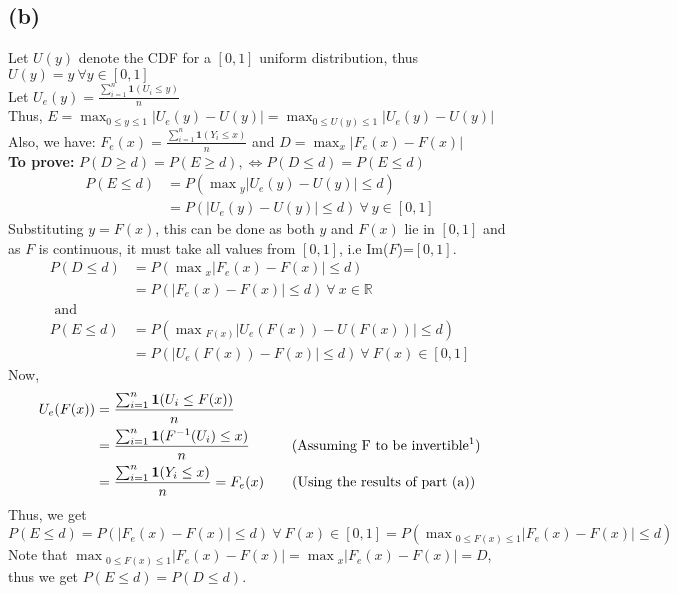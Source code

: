 \documentclass[11pt, fleqn]{article}
\begin{document}
\subsection*{(b)}
Let $U(y)$ denote the CDF for a $[0, 1]$ uniform distribution, thus $U(y) = y\  \forall y\in[0,1]$\\
Let $U_e(y) = \frac{\sum_{i=1}^n\mathbf{1}(U_i \le y)}{n} $\\
Thus, $E = \max_{0\le y\le 1} | U_e(y) - U(y) | = \max_{0\le U(y)\le 1} | U_e(y) - U(y) | $\\
Also, we have: $F_e(x) = \frac{\sum_{i=1}^n\mathbf{1}(Y_i \le x)}{n} $ and $D = \max_x | F_e(x) - F(x) |$\\
\textbf{To prove:} $P(D \ge d) = P(E \ge d), \iff P(D \le d) = P(E\le d)$\\
$$
\begin{aligned}
    P(E \le d) &= P(\max{}_y | U_e(y) - U(y) | \le d)\\
    &= P(| U_e(y) - U(y) | \le d) \ \forall \ y\in [0, 1]
\end{aligned}
$$
Substituting $y = F(x)$, this can be done as both $y$ and $F(x)$ lie in $[0, 1]$ and as $F$ is continuous, it must take all values from $[0, 1]$, i.e Im($F$)=$[0, 1]$.
$$
\begin{aligned}
    P(D \le d) &= P(\max{}_x | F_e(x) - F(x) | \le d)\\
    &= P(| F_e(x) - F(x) | \le d) \ \forall \ x\in\mathbb{R}\\
    \text{ and }\\
    P(E \le d) &= P(\max{}_{F(x)} | U_e(F(x)) - U(F(x)) | \le d)\\
    &= P(| U_e(F(x)) - F(x) | \le d) \ \forall \ F(x)\in [0, 1]
\end{aligned}
$$
Now,
$$
\begin{aligned}
   U_e(F(x)) &=  \frac{\sum_{i=1}^n\mathbf{1}(U_i \le F(x))}{n}\\
   &= \frac{\sum_{i=1}^n\mathbf{1}(F^{-1}(U_i) \le x)}{n} \hspace{3em} \text{(Assuming F to be invertible\footnotemark)}\\
   &= \frac{\sum_{i=1}^n\mathbf{1}(Y_i \le x)}{n} = F_e(x) \hspace{2em} \text{(Using the results of part (a))}
\end{aligned}
$$
Thus, we get $P(E \le d) = P(| F_e(x) - F(x) | \le d) \ \forall \ F(x)\in [0, 1] = P(\max{}_{0\le F(x) \le 1} | F_e(x) - F(x) | \le d)$\\
Note that $\max{}_{0\le F(x) \le 1} | F_e(x) - F(x) | = \max{}_x | F_e(x) - F(x) | = D$, thus we get $P(E \le d) = P(D \le d)$. \\
\end{document}
